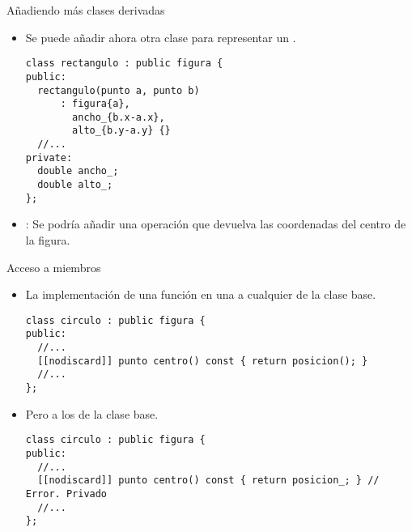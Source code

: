 \begin{frame}[t,fragile]{Añadiendo más clases derivadas}
\begin{itemize}
  \item Se puede añadir ahora otra clase para representar un .
\begin{lstlisting}
class rectangulo : public figura {
public:
  rectangulo(punto a, punto b) 
      : figura{a}, 
        ancho_{b.x-a.x},
        alto_{b.y-a.y} {}
  //...
private:
  double ancho_;
  double alto_;
};
\end{lstlisting}

  \item {}: Se podría añadir una operación 
        que devuelva las coordenadas del centro de la figura.
\end{itemize}
\end{frame}

\begin{frame}[t,fragile]{Acceso a miembros}
\begin{itemize}
  \item La implementación de una función en una 
         a cualquier  de la clase base.
\begin{lstlisting}
class circulo : public figura {
public:
  //...
  [[nodiscard]] punto centro() const { return posicion(); }
  //...
};
\end{lstlisting}

  \item Pero  a los 
        de la clase base.
\begin{lstlisting}
class circulo : public figura {
public:
  //...
  [[nodiscard]] punto centro() const { return posicion_; } // Error. Privado
  //...
};
\end{lstlisting}

\end{itemize}
\end{frame}

